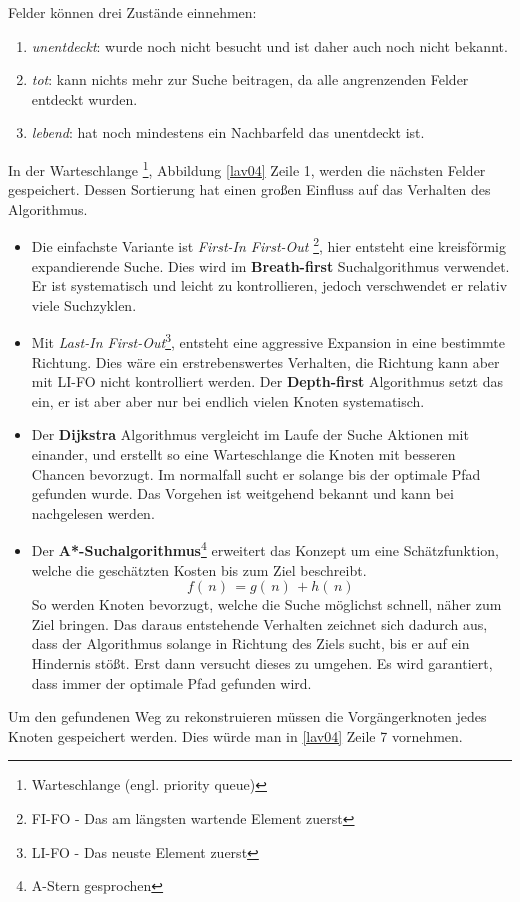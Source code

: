 Felder können drei Zustände einnehmen:
\begin{enumerate}

\item \textit{unentdeckt}: wurde noch nicht besucht und ist daher auch noch nicht bekannt.
\item \textit{tot}: kann nichts mehr zur Suche beitragen, da alle angrenzenden Felder entdeckt wurden.
\item \textit{lebend}: hat noch mindestens ein Nachbarfeld das unentdeckt ist.  
\end{enumerate} \cite[~S. 33]{Lav06}


In der Warteschlange \footnote{Warteschlange (engl. priority queue)}, Abbildung \ref{lav04} Zeile 1, werden die nächsten Felder gespeichert. Dessen Sortierung hat einen großen Einfluss auf das Verhalten des Algorithmus. 
	\begin{itemize}
		\item Die einfachste Variante ist \textit{First-In First-Out} \footnote{FI-FO - Das am längsten wartende Element zuerst}, hier entsteht eine kreisförmig expandierende Suche. Dies wird im \textbf{Breath-first} Suchalgorithmus verwendet. Er ist systematisch und leicht zu kontrollieren, jedoch verschwendet er relativ viele Suchzyklen.\cite[~S. 35]{Lav06}
		\item Mit \textit{Last-In First-Out}\footnote{LI-FO - Das neuste Element zuerst}, entsteht eine aggressive Expansion in eine bestimmte Richtung. 
		Dies wäre ein erstrebenswertes Verhalten, die Richtung kann aber mit LI-FO nicht kontrolliert werden. Der \textbf{Depth-first} Algorithmus setzt das ein, er ist aber aber nur bei endlich vielen Knoten systematisch. \cite[~S. 36]{Lav06}
		\item Der \textbf{Dijkstra} Algorithmus vergleicht im Laufe der Suche Aktionen mit einander, und erstellt so eine Warteschlange die Knoten mit besseren Chancen bevorzugt. Im normalfall sucht er solange bis der optimale Pfad gefunden wurde. Das Vorgehen ist weitgehend bekannt und kann bei \cite[~S. 36]{Lav06} nachgelesen werden.
		\item Der \textbf{A*-Suchalgorithmus}\footnote{A-Stern gesprochen} erweitert das Konzept um eine Schätzfunktion, welche die geschätzten Kosten bis zum Ziel beschreibt.
		$$f( \, n ) \, = g ( \, n ) \, + h ( \, n ) \,$$
		So werden Knoten bevorzugt, welche die Suche möglichst schnell, näher zum Ziel bringen. Das daraus entstehende Verhalten zeichnet sich dadurch aus, dass der Algorithmus solange in Richtung des Ziels sucht, bis er auf ein Hindernis stößt. Erst dann versucht dieses zu umgehen. Es wird garantiert, dass immer der optimale Pfad gefunden wird.\cite[~S. 37]{Lav06}
	\end{itemize}
Um den gefundenen Weg zu rekonstruieren müssen die Vorgängerknoten jedes Knoten gespeichert werden. Dies würde man in \ref{lav04} Zeile 7 vornehmen. 



